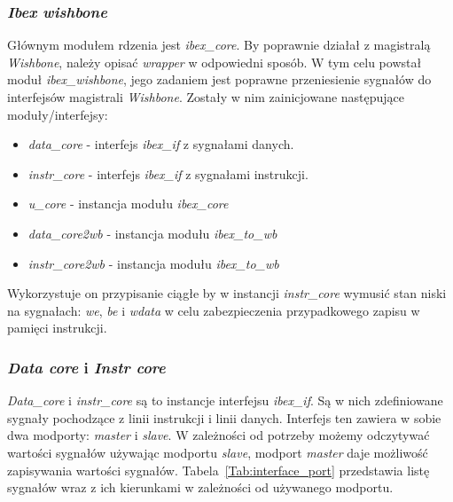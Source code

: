 \documentclass[11pt,a4paper]{article}
\begin{document}
	\subsubsection{\textit{Ibex wishbone}}
	\hspace{5mm}
		Głównym modułem rdzenia jest \textit{ibex\_core}. By poprawnie działał z magistralą \textit{Wishbone}, należy opisać \textit{wrapper} w odpowiedni sposób. W tym celu powstał moduł \textit{ibex\_wishbone}, jego zadaniem jest poprawne przeniesienie sygnałów do interfejsów magistrali \textit{Wishbone}. Zostały w nim zainicjowane następujące moduły/interfejsy:
\begin{itemize}
	\item \textit{data\_core} - interfejs \textit{ibex\_if} z sygnałami danych.
	\item \textit{instr\_core} - interfejs \textit{ibex\_if} z sygnałami instrukcji.
	\item \textit{u\_core} - instancja modułu \textit{ibex\_core}
	\item \textit{data\_core2wb} - instancja modułu \textit{ibex\_to\_wb}
	\item \textit{instr\_core2wb} - instancja modułu \textit{ibex\_to\_wb}
\end{itemize}		
Wykorzystuje on przypisanie ciągłe by w instancji \textit{instr\_core} wymusić stan niski na sygnałach: \textit{we}, \textit{be} i \textit{wdata} w celu zabezpieczenia przypadkowego zapisu w pamięci instrukcji.
			
	\subsubsection{\textit{Data core} i \textit{Instr core}}
	\hspace{5mm}
\textit{Data\_core} i \textit{instr\_core} są to instancje interfejsu \textit{ibex\_if}. Są w nich zdefiniowane sygnały pochodzące z linii instrukcji i linii danych. Interfejs ten zawiera w sobie dwa modporty: \textit{master} i \textit{slave}. W zależności od potrzeby możemy odczytywać wartości sygnałów używając modportu \textit{slave}, modport \textit{master} daje możliwość zapisywania wartości sygnałów. \mbox{Tabela \ref{Tab:interface_port}} przedstawia listę sygnałów wraz z ich kierunkami w zależności od używanego modportu.
\end{document}
